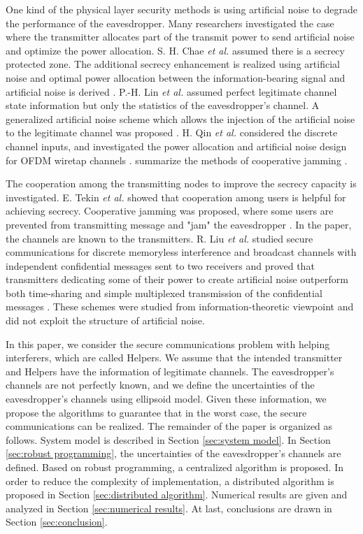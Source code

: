 \documentclass[conference]{IEEEtran}
\begin{document}
One kind of the physical layer security methods is using artificial noise to degrade the performance of the eavesdropper. Many researchers investigated the case where the transmitter allocates part of the transmit power to send artificial noise and optimize the power allocation. S. H. Chae \emph{et al.} assumed there is a secrecy protected zone. The additional secrecy enhancement is realized using artificial noise and optimal power allocation between the information-bearing signal and artificial noise is derived \cite{chae2014enhanced}.  P.-H. Lin \emph{et al.} assumed perfect legitimate channel state information but only the statistics of the eavesdropper's channel. A generalized artificial noise scheme which allows the injection of the artificial noise to the legitimate channel was proposed \cite{lin2013secrecy}. H. Qin \emph{et al.} considered the discrete channel inputs, and investigated the power allocation and artificial noise design for OFDM wiretap channels \cite{qin2013power}. summarize the methods of cooperative jamming \cite{cooperative_jamming}.

The cooperation among the transmitting nodes to improve the secrecy capacity is investigated. E. Tekin \emph{et al.} showed that cooperation among users is helpful for achieving secrecy. Cooperative jamming was proposed,  where some users are prevented from transmitting message and "jam" the eavesdropper \cite{tekin2008general}. In the paper, the channels are known to the transmitters. R. Liu \emph{et al.} studied secure communications for discrete memoryless interference and broadcast channels with independent confidential messages sent to two receivers and proved that transmitters dedicating some of their power to create artificial noise outperform both time-sharing and simple multiplexed transmission of the confidential messages \cite{liu2008discrete}. These schemes were studied from information-theoretic viewpoint and did not exploit the structure of artificial noise.


In this paper, we consider the secure communications problem with helping interferers, which are called Helpers. We assume that the intended transmitter and Helpers have the information of legitimate channels. The eavesdropper's channels are not perfectly known, and we define the uncertainties of the eavesdropper's channels using ellipsoid model. Given these information, we propose the algorithms to guarantee that in the worst case, the secure communications can be realized. The remainder of the paper is organized as follows. System model is described in Section \ref{sec:system model}. In Section \ref{sec:robust programming}, the uncertainties of the eavesdropper's channels are defined. Based on robust programming, a centralized algorithm is proposed. In order to reduce the complexity of implementation, a distributed algorithm is proposed in Section \ref{sec:distributed algorithm}. Numerical results are given and analyzed in Section \ref{sec:numerical results}. At last, conclusions are drawn in Section \ref{sec:conclusion}.
\end{document}
